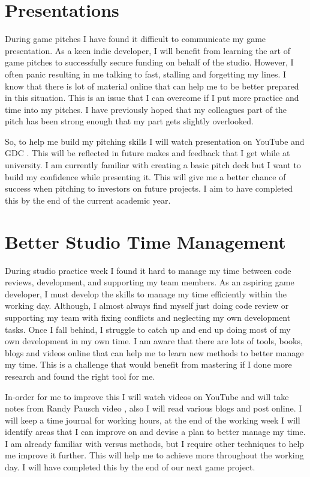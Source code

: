 \documentclass{scrartcl}
\begin{document}
\section{Presentations}

During game pitches I have found it difficult to communicate my game presentation. As a keen indie developer, I will benefit from learning the art of game pitches to successfully secure funding on behalf of the studio. However, I often panic resulting in me talking to fast, stalling and forgetting my lines. I know that there is lot of material online that can help me to be better prepared in this situation. This is an issue that I can overcome if I put more practice and time into my pitches. I have previously hoped that my colleagues part of the pitch has been strong enough that my part gets slightly overlooked.

So, to help me build my pitching skills I will watch presentation on YouTube \cite{youTube} and GDC \cite{gdc}. This will be reflected in future makes and feedback that I get while at university. I am currently familiar with creating a basic pitch deck but I want to build my confidence while presenting it. This will give me a better chance of success when pitching to investors on future projects. I aim to have completed this by the end of the current academic year.


\section{Better Studio Time Management}

During studio practice week I found it hard to manage my time between code reviews, development, and supporting my team members.  As an aspiring game developer, I must develop the skills to manage my time efficiently within the working day. Although, I almost always find myself just doing code review or supporting my team with fixing conflicts and neglecting my own development tasks. Once I fall behind, I struggle to catch up and end up doing most of my own development in my own time. I am aware that there are lots of tools, books, blogs and videos online that can help me to learn new methods to better manage my time. This is a challenge that would benefit from mastering if I done more research and found the right tool for me.

In-order for me to improve this I will watch videos on YouTube and will take notes from Randy Pausch video \cite{randy}, also I will read various blogs and post online. I will keep a time journal for working hours, at the end of the working week I will identify areas that I can improve on and devise a plan to better manage my time. I am already familiar with versus methods, but I require other techniques to help me improve it further. This will help me to achieve more throughout the working day. I will have completed this by the end of our next game project.  
\end{document}
